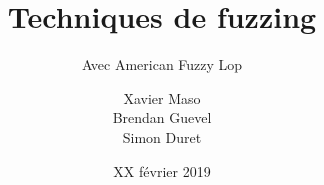 \documentclass{bredelebeamer}
\title[]{Techniques de fuzzing}
\subtitle{Avec American Fuzzy Lop}
\author[Xavier M. - Brendan G. - Simon D.]{Xavier Maso \\ Brendan Guevel \\ Simon Duret}
\institute[]{
  \texttt{[image: ../medias/universite-bordeaux.pdf]}
}
\date{XX février 2019}
\begin{document}
\begin{frame}
  \titlepage
\end{frame}


\end{document}
